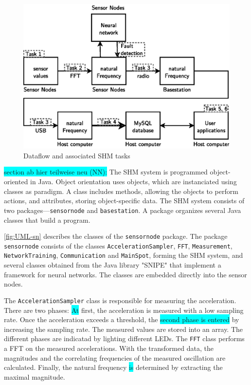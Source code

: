 \documentclass[12pt,a4paper]{scrartcl}
\begin{document}
\begin{figure}[htb]
    \centering
    \includegraphics{figures/dataflow_tasks_nn.eps}
    \caption{Dataflow and associated SHM tasks}
    \label{fig:flow}
\end{figure}

\colorbox{cyan}{section ab hier teilweise neu (NN):}
The SHM system is programmed object-oriented in Java. 
Object orientation uses objects, which are instanciated using classes as paradigm. 
A class includes methods, allowing the objects to perform actions, and attributes, storing object-specific data.
The SHM system consists of two packages---\texttt{sensornode} and \texttt{basestation}.
A package organizes several Java classes that build a program.

\autoref{fig:UML-sn} describes the classes of the \texttt{sensor\-node} package.
The package \texttt{sensor\-node} consists of the classes \texttt{Acceleration\-Sampler}, \texttt{FFT}, \texttt{Measure\-ment}, \texttt{Network\-Training}, \texttt{Communi\-cation} and \texttt{Main\-Spot}, forming the SHM system, and several classes obtained from the Java library "SNIPE"  that implement a framework for neural networks.
The classes are embedded directly into the sensor nodes.

The \texttt{Acceleration\-Sampler} class is responsible for measuring the acceleration.
There are two phases: \colorbox{cyan}{At} first, the acceleration is measured with a low sampling rate.
Once the acceleration exceeds a threshold, the \colorbox{cyan}{second phase is entered} by increasing the sampling rate. 
The measured values are stored into an array.
The different phases are indicatad by lighting different LEDs.
The \texttt{FFT} class performs a FFT on the measured accelerations. 
With the transformed data, the magnitudes and the correlating frequencies of the measured oscillation are calculated.
Finally, the natural frequency \colorbox{cyan}{is} determined by extracting the maximal magnitude.
\end{document}
